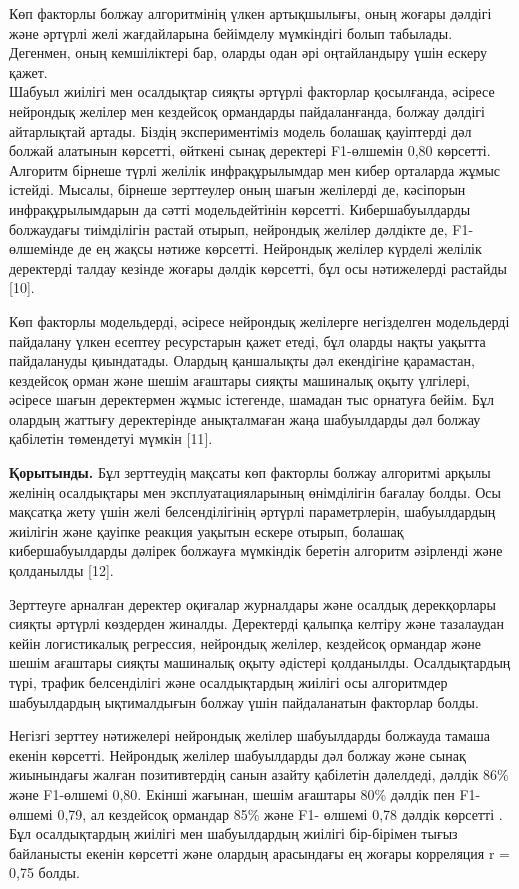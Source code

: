 Көп факторлы болжау алгоритмінің үлкен артықшылығы, оның жоғары дәлдігі
және әртүрлі желі жағдайларына бейімделу мүмкіндігі болып табылады.
Дегенмен, оның кемшіліктері бар, оларды одан әрі оңтайландыру үшін
ескеру қажет.\\
Шабуыл жиілігі мен осалдықтар сияқты әртүрлі факторлар қосылғанда,
әсіресе нейрондық желілер мен кездейсоқ ормандарды пайдаланғанда, болжау
дәлдігі айтарлықтай артады. Біздің экспериментіміз модель болашақ
қауіптерді дәл болжай алатынын көрсетті, өйткені сынақ деректері
F1-өлшемін 0,80 көрсетті. Алгоритм бірнеше түрлі желілік инфрақұрылымдар
мен кибер орталарда жұмыс істейді. Мысалы, бірнеше зерттеулер оның шағын
желілерді де, кәсіпорын инфрақұрылымдарын да сәтті модельдейтінін
көрсетті. Кибершабуылдарды болжаудағы тиімділігін растай отырып,
нейрондық желілер дәлдікте де, F1-өлшемінде де ең жақсы нәтиже көрсетті.
Нейрондық желілер күрделі желілік деректерді талдау кезінде жоғары
дәлдік көрсетті, бұл осы нәтижелерді растайды {[}10{]}.

Көп факторлы модельдерді, әсіресе нейрондық желілерге негізделген
модельдерді пайдалану үлкен есептеу ресурстарын қажет етеді, бұл оларды
нақты уақытта пайдалануды қиындатады. Олардың қаншалықты дәл екендігіне
қарамастан, кездейсоқ орман және шешім ағаштары сияқты машиналық оқыту
үлгілері, әсіресе шағын деректермен жұмыс істегенде, шамадан тыс
орнатуға бейім. Бұл олардың жаттығу деректерінде анықталмаған жаңа
шабуылдарды дәл болжау қабілетін төмендетуі мүмкін {[}11{]}.

{\bfseries Қорытынды.} Бұл зерттеудің мақсаты көп факторлы болжау алгоритмі
арқылы желінің осалдықтары мен эксплуатацияларының өнімділігін бағалау
болды. Осы мақсатқа жету үшін желі белсенділігінің әртүрлі
параметрлерін, шабуылдардың жиілігін және қауіпке реакция уақытын ескере
отырып, болашақ кибершабуылдарды дәлірек болжауға мүмкіндік беретін
алгоритм әзірленді және қолданылды {[}12{]}.

Зерттеуге арналған деректер оқиғалар журналдары және осалдық
дерекқорлары сияқты әртүрлі көздерден жиналды. Деректерді қалыпқа
келтіру және тазалаудан кейін логистикалық регрессия, нейрондық желілер,
кездейсоқ ормандар және шешім ағаштары сияқты машиналық оқыту әдістері
қолданылды. Осалдықтардың түрі, трафик белсенділігі және осалдықтардың
жиілігі осы алгоритмдер шабуылдардың ықтималдығын болжау үшін
пайдаланатын факторлар болды.

Негізгі зерттеу нәтижелері нейрондық желілер шабуылдарды болжауда тамаша
екенін көрсетті. Нейрондық желілер шабуылдарды дәл болжау және сынақ
жиынындағы жалған позитивтердің санын азайту қабілетін дәлелдеді, дәлдік
86\% және F1-өлшемі 0,80. Екінші жағынан, шешім ағаштары 80\% дәлдік пен
F1-өлшемі 0,79, ал кездейсоқ ормандар 85\% және F1- өлшемі 0,78 дәлдік
көрсетті . Бұл осалдықтардың жиілігі мен шабуылдардың жиілігі
бір-бірімен тығыз байланысты екенін көрсетті және олардың арасындағы ең
жоғары корреляция r = 0,75 болды.

